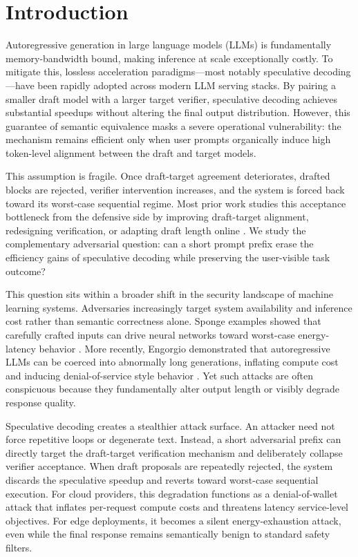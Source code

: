 \section{Introduction}

Autoregressive generation in large language models (LLMs) is fundamentally
memory-bandwidth bound, making inference at scale exceptionally costly. To
mitigate this, lossless acceleration paradigms---most notably speculative
decoding \citep{leviathan2023speculative}---have been rapidly adopted across
modern LLM serving stacks. By pairing a smaller draft model with a larger
target verifier, speculative decoding achieves substantial speedups without
altering the final output distribution. However, this guarantee of semantic
equivalence masks a severe operational vulnerability: the mechanism remains
efficient only when user prompts organically induce high token-level alignment
between the draft and target models.

This assumption is fragile. Once draft-target agreement deteriorates, drafted
blocks are rejected, verifier intervention increases, and the system is forced
back toward its worst-case sequential regime. Most prior work studies this
acceptance bottleneck from the defensive side by improving draft-target
alignment, redesigning verification, or adapting draft length online
\citep{liu2023online,goel2024direct,agrawal2024adaedl,bachmann2025judge,wang2025alignment,zhou2026hsd}.
We study the complementary adversarial question: can a short prompt prefix
erase the efficiency gains of speculative decoding while preserving the
user-visible task outcome?

This question sits within a broader shift in the security landscape of machine
learning systems. Adversaries increasingly target system availability and
inference cost rather than semantic correctness alone. Sponge examples showed
that carefully crafted inputs can drive neural networks toward worst-case
energy-latency behavior \citep{shumailov2021sponge}. More recently, Engorgio
demonstrated that autoregressive LLMs can be coerced into abnormally long
generations, inflating compute cost and inducing denial-of-service style
behavior \citep{dong2024engorgio}. Yet such attacks are often conspicuous
because they fundamentally alter output length or visibly degrade response
quality.

Speculative decoding creates a stealthier attack surface. An attacker need not
force repetitive loops or degenerate text. Instead, a short adversarial prefix
can directly target the draft-target verification mechanism and deliberately
collapse verifier acceptance. When draft proposals are repeatedly rejected,
the system discards the speculative speedup and reverts toward worst-case
sequential execution. For cloud providers, this degradation functions as a
denial-of-wallet attack that inflates per-request compute costs and threatens
latency service-level objectives. For edge deployments, it becomes a silent
energy-exhaustion attack, even while the final response remains semantically
benign to standard safety filters.

